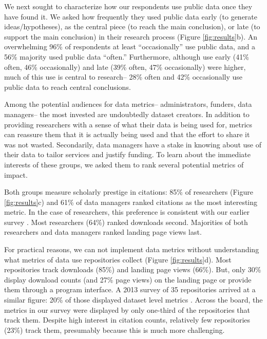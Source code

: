 \documentclass[english]{article}
\begin{document}
We next sought to characterize how our respondents use public data once they have found it.
We asked how frequently they used public data early (to generate ideas/hypotheses), as the central piece (to reach the main conclusion), or late (to support the main conclusion) in their research process (Figure \ref{fig:results}b).
An overwhelming 96\% of respondents at least ``occasionally'' use public data, and a 56\% majority used public data ``often.''
Furthermore, although use early (41\% often, 46\% occasionally) and late (39\% often, 47\% occasionally) were higher, much of this use is central to research-- 28\% often and 42\% occasionally use public data to reach central conclusions.



Among the potential audiences for data metrics-- administrators, funders, data managers-- the most invested are undoubtedly dataset creators.
In addition to providing researchers with a sense of what their data is being used for, metrics can reassure them that it is actually being used and that the effort to share it was not wasted.
Secondarily, data managers have a stake in knowing about use of their data to tailor services and justify funding. 
To learn about the immediate interests of these groups, we asked them to rank several potential metrics of impact. 

Both groups measure scholarly prestige in citations: 85\% of researchers (Figure \ref{fig:results}c) and 61\% of data managers ranked citations as the most interesting metric. 
In the case of researchers, this preference is consistent with our earlier survey \cite{kratz_researcher_2015}.
Most researchers (64\%) ranked downloads second. 
Majorities of both researchers and data managers ranked landing page views last.

For practical reasons, we can not implement data metrics without understanding what metrics of data use repositories collect (Figure \ref{fig:results}d). 
Most repositories track downloads (85\%) and landing page views (66\%). 
But, only 30\% display download counts (and 27\% page views) on the landing page or provide them through a program interface.
A 2013 survey of 35 repositories arrived at a similar figure: 20\% of those displayed dataset level metrics \cite{costas_value_2013}.
Across the board, the metrics in our survey were displayed by only one-third of the repositories that track them.
Despite high interest in citation counts, relatively few repositories (23\%) track them, presumably because this is much more challenging. 
\end{document}
